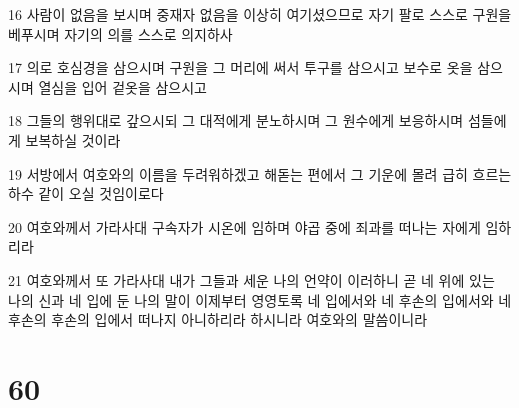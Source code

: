 \par 16 사람이 없음을 보시며 중재자 없음을 이상히 여기셨으므로 자기 팔로 스스로 구원을 베푸시며 자기의 의를 스스로 의지하사
\par 17 의로 호심경을 삼으시며 구원을 그 머리에 써서 투구를 삼으시고 보수로 옷을 삼으시며 열심을 입어 겉옷을 삼으시고
\par 18 그들의 행위대로 갚으시되 그 대적에게 분노하시며 그 원수에게 보응하시며 섬들에게 보복하실 것이라
\par 19 서방에서 여호와의 이름을 두려워하겠고 해돋는 편에서 그 기운에 몰려 급히 흐르는 하수 같이 오실 것임이로다
\par 20 여호와께서 가라사대 구속자가 시온에 임하며 야곱 중에 죄과를 떠나는 자에게 임하리라
\par 21 여호와께서 또 가라사대 내가 그들과 세운 나의 언약이 이러하니 곧 네 위에 있는 나의 신과 네 입에 둔 나의 말이 이제부터 영영토록 네 입에서와 네 후손의 입에서와 네 후손의 후손의 입에서 떠나지 아니하리라 하시니라 여호와의 말씀이니라

\chapter{60}


